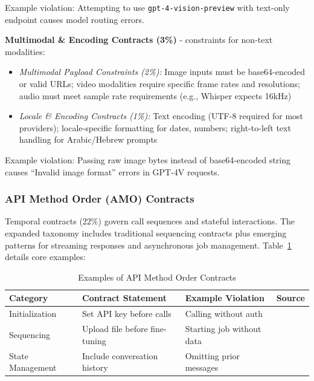 \documentclass[11pt]{article}
\begin{document}
Example violation: Attempting to use \texttt{gpt-4-vision-preview} with text-only endpoint causes model routing errors.

\textbf{Multimodal \& Encoding Contracts (3\%)} - constraints for non-text modalities:
\begin{itemize}
    \item \textit{Multimodal Payload Constraints (2\%):} Image inputs must be base64-encoded or valid URLs; video modalities require specific frame rates and resolutions; audio must meet sample rate requirements (e.g., Whisper expects 16kHz)~\cite{openai2023docs}
    \item \textit{Locale \& Encoding Contracts (1\%):} Text encoding (UTF-8 required for most providers); locale-specific formatting for dates, numbers; right-to-left text handling for Arabic/Hebrew prompts
\end{itemize}

Example violation: Passing raw image bytes instead of base64-encoded string causes ``Invalid image format'' errors in GPT-4V requests.

\subsubsection{API Method Order (AMO) Contracts}

Temporal contracts (22\%) govern call sequences and stateful interactions. The expanded taxonomy includes traditional sequencing contracts plus emerging patterns for streaming responses and asynchronous job management. Table~\ref{tab:amo_examples} details core examples:

\begin{table}[h]
\centering
\caption{Examples of API Method Order Contracts}
\label{tab:amo_examples}
\begin{tabular}{p{2.5cm}p{5cm}p{3.5cm}p{2.5cm}}
\toprule
\textbf{Category} & \textbf{Contract Statement} & \textbf{Example Violation} & \textbf{Source} \\
\midrule
Initialization & Set API key before calls & Calling without auth & \cite{stackoverflow76796341} \\
Sequencing & Upload file before fine-tuning & Starting job without data & \cite{openai2023docs} \\
State Management & Include conversation history & Omitting prior messages & \cite{githublangchain10316} \\
\bottomrule
\end{tabular}
\end{table}
\end{document}
